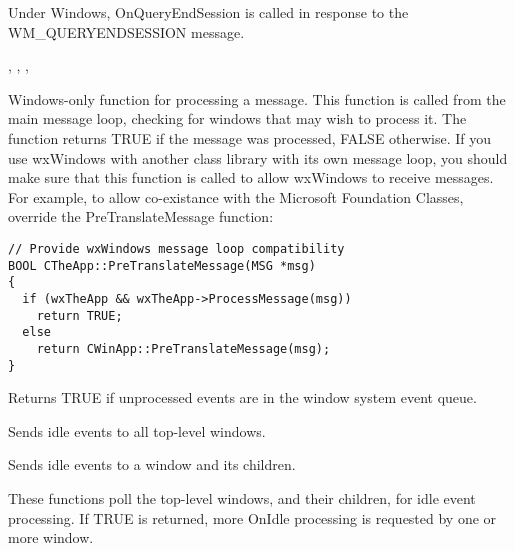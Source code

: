 Under Windows, OnQueryEndSession is called in response to the WM\_QUERYENDSESSION message.


,\rtfsp
{},\rtfsp
{},\rtfsp
{}

\label{wxappprocessmessage}


Windows-only function for processing a message. This function
is called from the main message loop, checking for windows that
may wish to process it. The function returns TRUE if the message
was processed, FALSE otherwise. If you use wxWindows with another class
library with its own message loop, you should make sure that this
function is called to allow wxWindows to receive messages. For example,
to allow co-existance with the Microsoft Foundation Classes, override
the PreTranslateMessage function:

\begin{verbatim}
// Provide wxWindows message loop compatibility
BOOL CTheApp::PreTranslateMessage(MSG *msg)
{
  if (wxTheApp && wxTheApp->ProcessMessage(msg))
    return TRUE;
  else
    return CWinApp::PreTranslateMessage(msg);
}
\end{verbatim}

\label{wxapppending}


Returns TRUE if unprocessed events are in the window system event queue.



\label{wxappsendidleevents}


Sends idle events to all top-level windows.


Sends idle events to a window and its children.


These functions poll the top-level windows, and their children, for idle event processing.
If TRUE is returned, more OnIdle processing is requested by one or more window.

